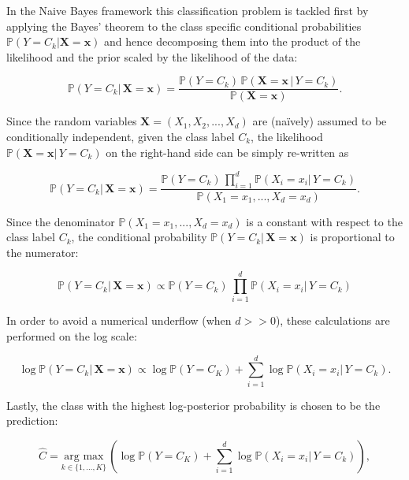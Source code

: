 \documentclass{article}\usepackage[]{graphicx}\usepackage[]{color}
\begin{document}
In the Naive Bayes framework this classification problem is tackled first by applying the Bayes' theorem to the class specific conditional probabilities $\mathbb{P}(Y = C_k | \boldsymbol{X} = \boldsymbol{x})$ and hence decomposing them into the product of the likelihood and the prior scaled by the likelihood of the data:


\begin{equation}
 \mathbb{P}(Y = C_k | \,\boldsymbol{X} = \boldsymbol{x}) = \frac{\mathbb{P}(Y = C_k) \, \mathbb{P}(\boldsymbol{X} = \boldsymbol{x} \,| \, Y = C_k)}{ \mathbb{P}(\boldsymbol{X} = \boldsymbol{x})}.
\end{equation}


Since the random variables $\boldsymbol{X} = (X_1,X_2,...,X_d)$ are (na\"ively) assumed to be conditionally independent, given the class label $C_k$, the likelihood $\mathbb{P}(\boldsymbol{X} = \boldsymbol{x} | \, Y = C_k)$ on the right-hand side can be simply re-written as


\begin{equation}
 \mathbb{P}(Y = C_k | \, \boldsymbol{X} = \boldsymbol{x}) =  \frac{\mathbb{P}(Y = C_k) \, \prod_{i=1}^d \mathbb{P}(X_i = x_i | \, Y = C_k)}{ \mathbb{P}(X_1 = x_1,..., X_d = x_d)}.
\end{equation}


Since the denominator $\mathbb{P}(X_1 = x_1,..., X_d = x_d)$ is a constant with respect to the class label $C_k$, the conditional probability $\mathbb{P}(Y = C_k | \, \boldsymbol{X} = \boldsymbol{x})$ is proportional to the numerator:


\begin{equation}
\label{eq:eq3}
\mathbb{P}(Y = C_k | \, \boldsymbol{X} = \boldsymbol{x}) \propto \mathbb{P}(Y = C_k) \, \prod_{i=1}^d \mathbb{P}(X_i = x_i | \, Y = C_k)
\end{equation}


In order to avoid a numerical underflow (when $d >> 0$), these calculations are performed on the log scale:


\begin{equation}
\label{eq:logprob}
\log \mathbb{P}(Y = C_k | \, \boldsymbol{X} = \boldsymbol{x}) \propto  \log \mathbb{P}(Y = C_K) + \sum_{i=1}^d \log \mathbb{P}(X_i = x_i | \, Y = C_k).
\end{equation}


Lastly, the class with the highest log-posterior probability is chosen to be the prediction:

\begin{equation}
\hat{C} = \underset{k \in \{1,...,K \}}{\text{arg max}} \, \left( \log \mathbb{P}(Y = C_K) + \sum_{i=1}^d \log \mathbb{P}(X_i = x_i | \, Y = C_k) \right),
\end{equation}
\end{document}
